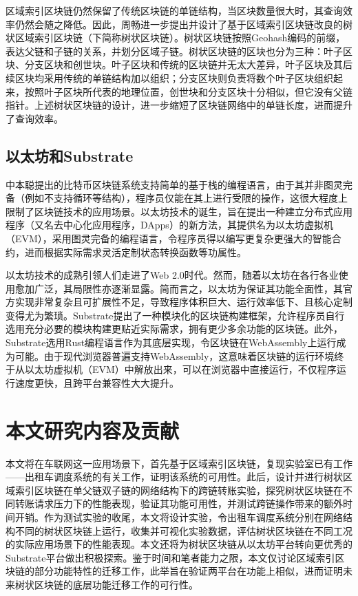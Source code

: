 区域索引区块链仍然保留了传统区块链的单链结构，当区块数量很大时，其查询效率仍然会随之降低。因此，周畅进一步提出并设计了基于区域索引区块链改良的树状区域索引区块链（下简称树状区块链）。树状区块链按照Geohash编码的前缀，表达父链和子链的关系，并划分区域子链。树状区块链的区块也分为三种：叶子区块、分支区块和创世块。叶子区块和传统的区块链并无太大差异，叶子区块及其后续区块均采用传统的单链结构加以组织；分支区块则负责将数个叶子区块组织起来，按照叶子区块所代表的地理位置，创世块和分支区块十分相似，但它没有父链指针。上述树状区块链的设计，进一步缩短了区块链网络中的单链长度，进而提升了查询效率。

\subsection{以太坊和Substrate}

中本聪提出的比特币区块链系统支持简单的基于栈的编程语言，由于其并非图灵完备（例如不支持循环等结构），程序员仅能在其上进行受限的操作，这很大程度上限制了区块链技术的应用场景。以太坊\cite{ethereumWhitePaper}技术的诞生，旨在提出一种建立分布式应用程序（又名去中心化应用程序，DApps）的新方法，其提供名为以太坊虚拟机（EVM），采用图灵完备的编程语言，令程序员得以编写更复杂更强大的智能合约，进而根据实际需求灵活定制状态转换函数等功属性。

以太坊技术的成熟引领人们走进了Web 2.0时代。然而，随着以太坊在各行各业使用愈加广泛，其局限性亦逐渐显露。简而言之，以太坊为保证其功能全面性，其官方实现非常复杂且可扩展性不足，导致程序体积巨大、运行效率低下、且核心定制变得尤为繁琐。Substrate提出了一种模块化的区块链构建框架，允许程序员自行选用充分必要的模块构建更贴近实际需求，拥有更少多余功能的区块链。此外，Substrate选用Rust编程语言作为其底层实现，令区块链在WebAssembly上运行成为可能。由于现代浏览器普遍支持WebAssembly，这意味着区块链的运行环境终于从以太坊虚拟机（EVM）中解放出来，可以在浏览器中直接运行，不仅程序运行速度更快，且跨平台兼容性大大提升。

\section{本文研究内容及贡献}

本文将在车联网这一应用场景下，首先基于区域索引区块链，复现实验室已有工作——出租车调度系统的有关工作，证明该系统的可用性。此后，设计并进行树状区域索引区块链在单父链双子链的网络结构下的跨链转账实验，探究树状区块链在不同转账请求压力下的性能表现，验证其功能可用性，并测试跨链操作带来的额外时间开销。作为测试实验的收尾，本文将设计实验，令出租车调度系统分别在网络结构不同的树状区块链上运行，收集并可视化实验数据，评估树状区块链在不同工况的实际应用场景下的性能表现。本文还将为树状区块链从以太坊平台转向更优秀的Substrate平台做出积极探索。鉴于时间和笔者能力之限，本文仅讨论区域索引区块链的部分功能特性的迁移工作，此举旨在验证两平台在功能上相似，进而证明未来树状区块链的底层功能迁移工作的可行性。

